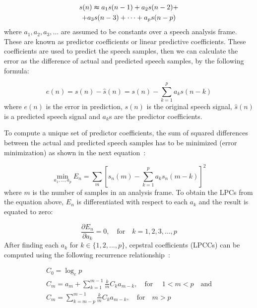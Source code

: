 \begin{multline}
	s(n) \thickapprox a_1s(n - 1) + a_2s(n - 2) +\\+ a_3s(n - 3) + \dots + a_ps(n - p)
\end{multline}
where $a_1, a_2, a_3, \dots$ are assumed to be constants over a speech analysis frame. These are known as predictor coefficients or linear predictive coefficients. These coefficients are used to predict the speech samples, then we can calculate the error as the difference of actual and predicted speech samples, by the following formula:

\begin{equation}
	e(n) = s(n) - \hat{s}(n) = s(n) - \sum_{k = 1}^{p}a_ks(n - k)
\end{equation}
where $e(n)$ is the error in prediction, $s(n)$ is the original speech signal, $\hat{s}(n)$ is a predicted speech signal and $a_k$s are the predictor coefficients.

To compute a unique set of predictor coefficients, the sum of squared differences between the actual and predicted speech samples has to be minimized (error minimization) as shown in the next equation~\cite{rao:spectral}:

\begin{equation}
	\min_{a_1, ..., a_p} E_n = \sum_{m} \left[ s_n(m) - \sum_{k = 1}^{p}a_k s_n (m - k)\right]^2
\end{equation}
where $m$ is the number of samples in an analysis frame. To obtain the LPCs from the equation above, $E_n$ is differentiated with respect to each $a_k$ and the result is equated to zero:

\begin{equation}
	\frac{\partial E_n}{\partial a_k} = 0, \quad \text{for} \quad k = 1, 2, 3, \dots, p
\end{equation}
After finding each $a_k$ for $k \in \{1, 2, ..., p\}$, cepstral coefficients (LPCCs) can be computed using the following recurrence relationship~\cite{rao:spectral}:

\begin{gather}
	C_0 = \log_{e}p\\	
	C_m = a_m + \sum_{k = 1}^{m - 1} \frac{k}{m} C_k a_{m - k}, \quad \text{for }  \quad 1 < m < p \quad \text{and}\\
	C_m = \sum_{k = m - p}^{m - 1} \frac{k}{m} C_k a_{m - k}, \quad \text{for} \quad m > p
\end{gather}